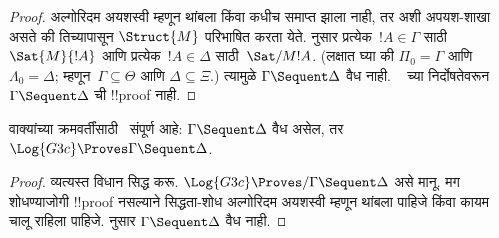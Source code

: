 \documentclass[../../../include/open-logic-section]{subfiles}
\begin{document}
\begin{proof}
  अल्गोरिदम अयशस्वी म्हणून थांबला किंवा कधीच समाप्त झाला नाही,
  तर अशी अपयश-शाखा असते की तिच्यापासून
  $\Struct{M}$ परिभाषित करता येते.
   नुसार प्रत्येक~$!A \in \Gamma$
  साठी~$\Sat{M}{!A}$ आणि प्रत्येक~$!A \in \Delta$
  साठी~$\Sat/{M}{!A}$. (लक्षात घ्या की
  $\Pi_0 = \Gamma$ आणि~$\Lambda_0 = \Delta$;
  म्हणून~$\Gamma \subseteq \Theta$ आणि
  $\Delta \subseteq \Xi$.) त्यामुळे
  $\Gamma \Sequent \Delta$ वैध नाही.
  ~ च्या निर्दोषतेवरून
  $\Gamma \Sequent \Delta$ ची !!{proof} नाही.
\end{proof}

\begin{cor}
वाक्यांच्या क्रमवर्तींसाठी~ संपूर्ण आहे:
$\Gamma \Sequent \Delta$ वैध असेल,
तर~$\Log{G3c} \Proves \Gamma \Sequent \Delta$.
\end{cor}

\begin{proof}
  व्यत्यस्त विधान सिद्ध करू.
  $\Log{G3c} \Proves/ \Gamma \Sequent \Delta$
  असे मानू. मग शोधण्याजोगी !!{proof} नसल्याने
  सिद्धता-शोध अल्गोरिदम अयशस्वी म्हणून थांबला पाहिजे
  किंवा कायम चालू राहिला पाहिजे.
   नुसार
  $\Gamma \Sequent \Delta$ वैध नाही.
\end{proof}
\end{document}
